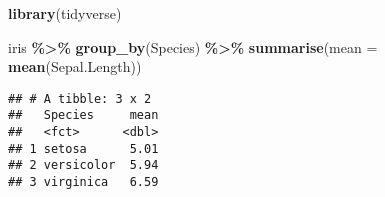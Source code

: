 \documentclass[
]{article}
\newenvironment{Shaded}{\begin{snugshade}}{\end{snugshade}}
\newcommand{\AttributeTok}[1]{\textcolor[rgb]{0.13,0.29,0.53}{#1}}
\newcommand{\FunctionTok}[1]{\textcolor[rgb]{0.13,0.29,0.53}{\textbf{#1}}}
\newcommand{\NormalTok}[1]{#1}
\newcommand{\SpecialCharTok}[1]{\textcolor[rgb]{0.81,0.36,0.00}{\textbf{#1}}}
\begin{document}
\begin{Shaded}
\begin{Highlighting}[]
\FunctionTok{library}\NormalTok{(tidyverse)}

\NormalTok{iris }\SpecialCharTok{\%\textgreater{}\%}
  \FunctionTok{group\_by}\NormalTok{(Species) }\SpecialCharTok{\%\textgreater{}\%}
  \FunctionTok{summarise}\NormalTok{(}\AttributeTok{mean =} \FunctionTok{mean}\NormalTok{(Sepal.Length))}
\end{Highlighting}
\end{Shaded}

\begin{verbatim}
## # A tibble: 3 x 2
##   Species     mean
##   <fct>      <dbl>
## 1 setosa      5.01
## 2 versicolor  5.94
## 3 virginica   6.59
\end{verbatim}
\end{document}
